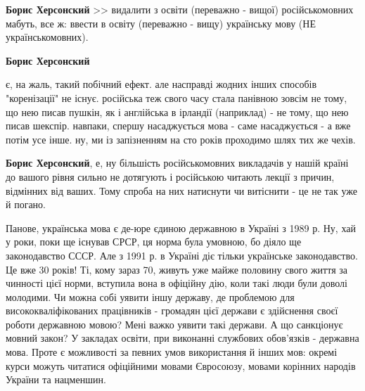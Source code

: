 \begin{itemize}
\begin{itemize}
 
\textbf{Борис Херсонский} >> видалити з освіти (переважно - вищої) російськомовних
мабуть, все ж: ввести в освіту (переважно - вищу) українську мову (НЕ українськомовних).

 

\textbf{Борис Херсонский} 

є, на жаль, такий побічний ефект. але насправді жодних інших способів
"коренізації" не існує. російська теж свого часу стала панівною зовсім не тому,
що нею писав пушкін, як і англійська в ірландії (наприклад) - не тому, що нею
писав шекспір. навпаки, спершу насаджується мова - саме насаджується - а вже
потім усе інше. ну, ми із запізненням на сто років проходимо шлях тих же чехів.

 
\textbf{Борис Херсонский}, е, ну більшість російськомовних викладачів у нашій країні до вашого рівня сильно не дотягують і російською читають лекції з причин, відмінних від ваших. Тому спроба на них натиснути чи витіснити - це не так уже й погано.

 

Панове, українська мова є де-юре єдиною державною в Україні з 1989 р. Ну, хай у
роки, поки ще існував СРСР, ця норма була умовною, бо діяло ще законодавство
СССР. Але з 1991 р. в Україні діє тільки українське законодавство. Це вже 30
років! Ті, кому зараз 70, живуть уже майже половину свого життя за чинності
цієї норми, вступила вона в офіційну дію, коли такі люди були доволі молодими.
Чи можна собі уявити іншу державу, де проблемою для висококваліфікованих
працівників - громадян цієї держави є здійснення своєї роботи державною мовою?
Мені важко уявити такі держави. А що санкціонує мовний закон? У закладах
освіти, при виконанні службових обов'язків - державна мова. Проте є можливості
за певних умов використання й інших мов: окремі курси можуть читатися
офіційними мовами Євросоюзу, мовами корінних народів України та нацменшин.


\end{itemize}
\end{itemize}
